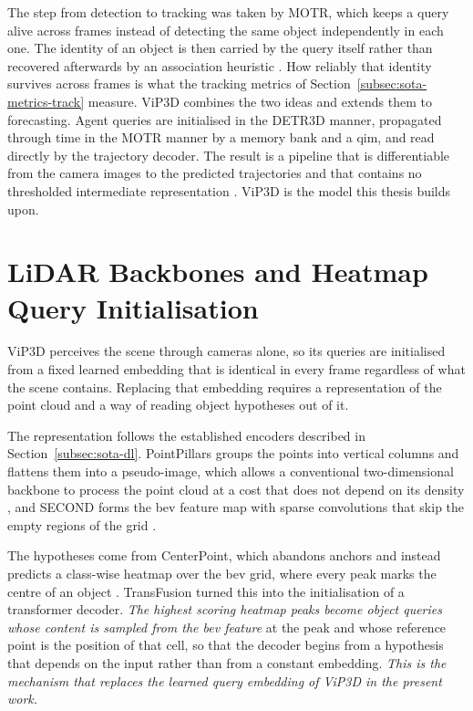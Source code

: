 The step from detection to tracking was taken by MOTR, which keeps a query alive across frames instead
of detecting the same object independently in each one. The identity of an object is then carried by the
query itself rather than recovered afterwards by an association heuristic \cite{Zeng2022MOTR}. How reliably
that identity survives across frames is what the tracking metrics of
Section~\ref{subsec:sota-metrics-track} measure. ViP3D
combines the two ideas and extends them to forecasting. Agent queries are initialised in the DETR3D
manner, propagated through time in the MOTR manner by a memory bank and a \ac{qim},
and read directly by the trajectory decoder. The result is a pipeline that is differentiable from the
camera images to the predicted trajectories and that contains no thresholded intermediate representation
\cite{Gu2023ViP3D}. ViP3D is the model this thesis builds upon.



\section{LiDAR Backbones and Heatmap Query Initialisation}
\label{sec:rw-lidar}


ViP3D perceives the scene through cameras alone, so its queries are initialised from a fixed learned
embedding that is identical in every frame regardless of what the scene contains. Replacing that embedding
requires a representation of the point cloud and a way of reading object hypotheses out of it.

The representation follows the established encoders described in
Section~\ref{subsec:sota-dl}. PointPillars groups the points into vertical columns and flattens them into a
pseudo-image, which allows a conventional two-dimensional backbone to process the point cloud at a cost
that does not depend on its density \cite{Lang2019PointPillars}, and SECOND forms the \ac{bev} feature map
with sparse convolutions that skip the empty regions of the grid \cite{Yan2018SECOND}.

The hypotheses come from CenterPoint, which abandons anchors and instead predicts a class-wise heatmap over
the \ac{bev} grid, where every peak marks the centre of an object \cite{Yin2021CenterPoint}. TransFusion \cite{Bai2022TransFusion}
turned this into the initialisation of a transformer decoder. \emph{The highest scoring heatmap peaks become
object queries whose content is sampled from the \ac{bev} feature} at the peak and whose reference point is
the position of that cell, so that the decoder begins from a hypothesis that depends on the input
rather than from a constant embedding. \emph{This is the mechanism that replaces the
learned query embedding of ViP3D in the present work.}



